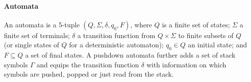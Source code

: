 \documentclass[runningheads]{llncs}
\newcommand{\support}{\mathit{Supp}}
\newcommand{\T}{\Sigma} %
\begin{document}
\paragraph{Automata}
An automata is a 5-tuple $(Q,\T,\delta,q_0,F)$, where $Q$ is a
finite set of states; $\T$ a finite set of terminals; $\delta$ a
transition function from $Q \times \T$ to finite subsets of $Q$
(or single states of $Q$ for a deterministic automaton);
$q_0 \in Q$ an initial state; and $F \subseteq Q$ a set of final
states.
%
A pushdown automata further adds a set of stack symbols $\Gamma$
and equips the transition function $\delta$ with information on
which symbols are pushed, popped or just read from the stack.








\end{document}

